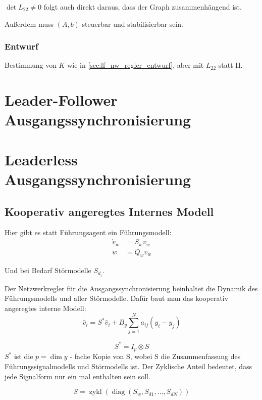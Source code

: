 $\det L_{22} \neq 0$ folgt auch direkt daraus, dass der Graph zusammenhängend ist.

Außerdem muss $(A,b)$ steuerbar und stabilisierbar sein.

\subsubsection{Entwurf}
Bestimmung von $K$ wie in \ref{sec:lf_nw_regler_entwurf},
aber mit $L_{22}$ statt H.


\pagebreak
\section{Leader-Follower Ausgangssynchronisierung}

\pagebreak
\section{Leaderless Ausgangssynchronisierung}
\subsection{Kooperativ angeregtes Internes Modell}
Hier gibt es statt Führungsagent ein Führungsmodell:
\begin{align}
    \dot{v}_w &= S_w v_w \\
    w &= Q_w v_w
\end{align}

Und bei Bedarf Störmodelle $S_{d_i}$.

Der Netzwerkregler für die Ausgangssynchronisierung beinhaltet die
Dynamik des Führungsmodells und aller Störmodelle.
Dafür baut man das kooperativ angeregtes interne Modell:
\begin{equation}
    \dot{\bar{v}}_i = S^*\bar{v}_i + B_y \sum_{j=1}^N a_{ij} (y_i-y_j)
\end{equation}

\begin{equation}
    S^* = I_p \otimes S
\end{equation}
$S^*$ ist die $p=\dim y$ - fache Kopie von S, wobei S die Zusammenfassung des
Führungssignalmodells und Störmodells ist. Der Zyklische Anteil bedeutet, dass jede
Signalform nur ein mal enthalten sein soll.

\begin{equation}
    S = \operatorname{zykl}(\operatorname{diag} (S_w, S_{d1}, \dots, S_{dN}))
\end{equation}


